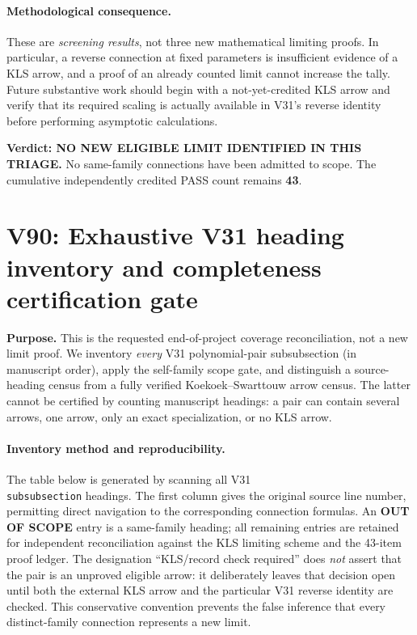 \documentclass[11pt]{article}
\begin{document}
\paragraph{Methodological consequence.}
These are \emph{screening results}, not three new mathematical limiting proofs. In particular, a reverse connection at fixed parameters is insufficient evidence of a KLS arrow, and a proof of an already counted limit cannot increase the tally. Future substantive work should begin with a not-yet-credited KLS arrow and verify that its required scaling is actually available in V31's reverse identity before performing asymptotic calculations.

\noindent\textbf{Verdict: NO NEW ELIGIBLE LIMIT IDENTIFIED IN THIS TRIAGE.} No same-family connections have been admitted to scope. The cumulative independently credited PASS count remains \textbf{43}.


\section{V90: Exhaustive V31 heading inventory and completeness certification gate}
\noindent\textbf{Purpose.} This is the requested end-of-project coverage reconciliation, not a new limit proof. We inventory \emph{every} V31 polynomial-pair subsubsection (in manuscript order), apply the self-family scope gate, and distinguish a source-heading census from a fully verified Koekoek--Swarttouw arrow census. The latter cannot be certified by counting manuscript headings: a pair can contain several arrows, one arrow, only an exact specialization, or no KLS arrow.

\paragraph{Inventory method and reproducibility.} The table below is generated by scanning all V31 \texttt{\\subsubsection} headings. The first column gives the original source line number, permitting direct navigation to the corresponding connection formulas. An \textbf{OUT OF SCOPE} entry is a same-family heading; all remaining entries are retained for independent reconciliation against the KLS limiting scheme and the 43-item proof ledger. The designation ``KLS/record check required'' does \emph{not} assert that the pair is an unproved eligible arrow: it deliberately leaves that decision open until both the external KLS arrow and the particular V31 reverse identity are checked. This conservative convention prevents the false inference that every distinct-family connection represents a new limit.
\end{document}
